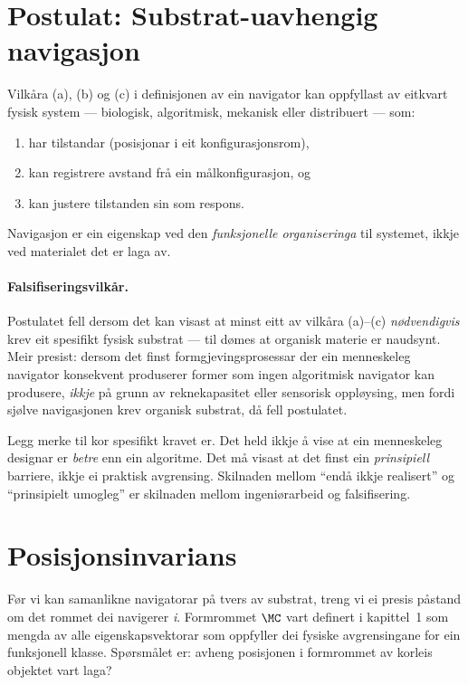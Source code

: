\section{Postulat: Substrat-uavhengig navigasjon}

\begin{postmark}\label{post:L.7.1}
Vilkåra (a), (b) og (c) i definisjonen av ein navigator kan
oppfyllast av eitkvart fysisk system --- biologisk, algoritmisk,
mekanisk eller distribuert --- som:
\begin{enumerate}[label=(\roman*),nosep]
  \item har tilstandar (posisjonar i eit konfigurasjonsrom),
  \item kan registrere avstand frå ein målkonfigurasjon, og
  \item kan justere tilstanden sin som respons.
\end{enumerate}
Navigasjon er ein eigenskap ved den \emph{funksjonelle
organiseringa} til systemet, ikkje ved materialet det er laga av.
\end{postmark}

\paragraph{Falsifiseringsvilkår.}
Postulatet fell dersom det kan visast at minst eitt av vilkåra
(a)--(c) \emph{nødvendigvis} krev eit spesifikt fysisk substrat
--- til dømes at organisk materie er naudsynt. Meir presist:
dersom det finst formgjevingsprosessar der ein menneskeleg
navigator konsekvent produserer former som ingen algoritmisk
navigator kan produsere, \emph{ikkje} på grunn av reknekapasitet
eller sensorisk oppløysing, men fordi sjølve navigasjonen krev
organisk substrat, då fell postulatet.

\medskip
Legg merke til kor spesifikt kravet er. Det held ikkje å vise at
ein menneskeleg designar er \emph{betre} enn ein algoritme. Det
må visast at det finst ein \emph{prinsipiell} barriere, ikkje ei
praktisk avgrensing. Skilnaden mellom ``endå ikkje realisert''
og ``prinsipielt umogleg'' er skilnaden mellom ingeniørarbeid
og falsifisering.


\section{Posisjonsinvarians}

Før vi kan samanlikne navigatorar på tvers av substrat, treng vi
ei presis påstand om det rommet dei navigerer \emph{i}. Formrommet
$\MC$ vart definert i kapittel~1 som mengda av alle
eigenskapsvektorar som oppfyller dei fysiske avgrensingane for ein
funksjonell klasse. Spørsmålet er: avheng posisjonen i formrommet
av korleis objektet vart laga?

